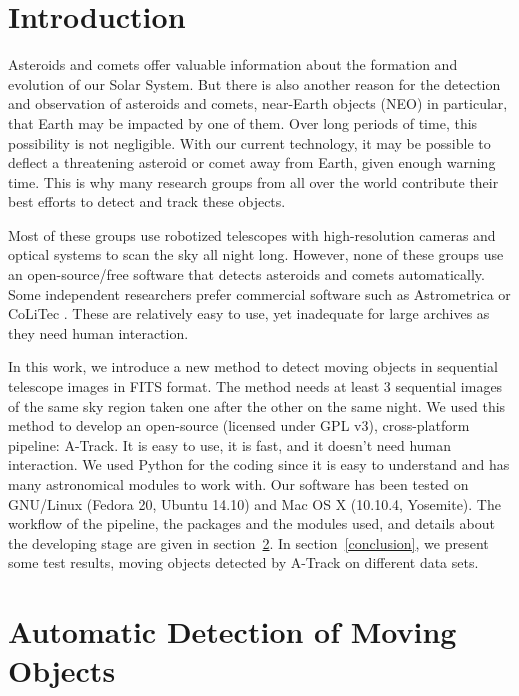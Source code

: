 \documentclass[review]{elsarticle}
\begin{document}

\section{Introduction}

Asteroids and comets offer valuable information about the formation and evolution 
of our Solar System. But there is also another reason for the detection and observation 
of asteroids and comets, near-Earth objects (NEO) in particular, that Earth may be 
impacted by one of them. Over long periods of time, this possibility is not negligible. 
With our current technology, it may be possible to deflect a threatening asteroid or comet 
away from Earth, given enough warning time. This is why many research groups from all over 
the world contribute their best efforts to detect and track these objects.

Most of these groups use robotized telescopes with high-resolution cameras and optical systems to scan the sky all night long. However, none of these groups use an open-source/free software that detects asteroids and comets automatically. Some independent researchers prefer commercial software such as Astrometrica \citep{raab2012} or CoLiTec \citep{savanevich2012}. These are relatively easy to use, yet inadequate for large archives as they need human interaction.

In this work, we introduce a new method to detect moving objects in sequential telescope images in FITS format. The method needs at least 3 sequential images of the same sky region taken one after the other on the same night. We used this method to develop an open-source (licensed under GPL v3), cross-platform pipeline: A-Track. It is easy to use, it is fast, and it doesn't need human interaction. We used Python for the coding since it is easy to understand and has many astronomical modules to work with. Our software has been tested on GNU/Linux (Fedora 20, Ubuntu 14.10) and Mac OS X (10.10.4, Yosemite). The workflow of the pipeline, the packages and the modules used, and details about the developing stage are given in section~\ref{sec:detection}. In section~\ref{conclusion}, we present some test results, moving objects detected by A-Track on different data sets.


\section{Automatic Detection of Moving Objects} \label{sec:detection}
\end{document}
